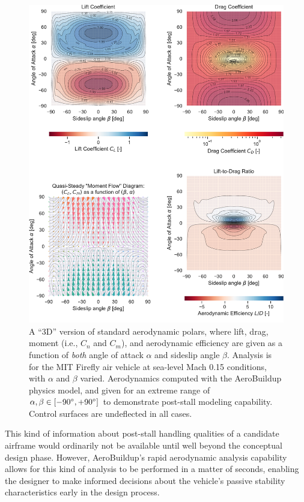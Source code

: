 \begin{figure}[!htb]
    \centering
    \includegraphics[width=\textwidth]{../figures/aerobuildup_figs/high_alpha.pdf}
    \caption{A ``3D'' version of standard aerodynamic polars, where lift, drag, moment (i.e., $C_n$ and $C_m$), and aerodynamic efficiency are given as a function of \emph{both} angle of attack $\alpha$ and sideslip angle $\beta$. Analysis is for the MIT Firefly air vehicle at sea-level Mach 0.15 conditions, with $\alpha$ and $\beta$ varied. Aerodynamics computed with the AeroBuildup physics model, and given for an extreme range of $\alpha, \beta \in [-90\degree, +90\degree]$ to demonstrate post-stall modeling capability. Control surfaces are undeflected in all cases.}
    \label{fig:ab_high_aoa}
\end{figure}

This kind of information about post-stall handling qualities of a candidate airframe would ordinarily not be available until well beyond the conceptual design phase. However, AeroBuildup's rapid aerodynamic analysis capability allows for this kind of analysis to be performed in a matter of seconds, enabling the designer to make informed decisions about the vehicle's passive stability characteristics early in the design process.

